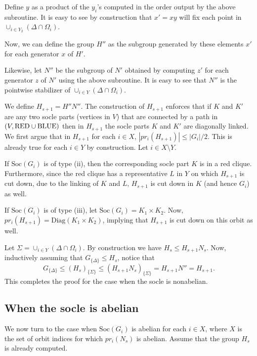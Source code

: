 \documentclass[11pt]{article}
\newcommand{\red}{\mbox{\rm RED}}
\newcommand{\blue}{\mbox{\rm BLUE}}
\newcommand{\Soc}[1]{\ensuremath{\mathrm{Soc}\left(#1\right)}}
\newcommand{\Diag}[1]{\ensuremath{\mathrm{Diag}\left({#1}\right)}}
\newcommand{\pr}[2]{\ensuremath{pr_{#1}\left({#2}\right)}}
\begin{document}
Define $y$ as a product of the $y_i$'s computed in the order output by
the above subroutine. It is easy to see by construction that $x'=xy$
will fix each point in $\cup_{i\in Y_2}(\Delta\cap\Omega_i)$.

Now, we can define the group $H''$ as the subgroup generated by these
elements $x'$ for each generator $x$ of $H'$. 

Likewise, let $N''$ be the subgroup of $N'$ obtained by computing $z'$
for each generator $z$ of $N'$ using the above subroutine. It is easy
to see that $N''$ is the pointwise stabilizer of $\cup_{i\in
Y}(\Delta\cap\Omega_i)$. 

We define $H_{s+1}=H''N''$. The construction of $H_{s+1}$ enforces
that if $K$ and $K'$ are any two socle parts (vertices in $V$) that
are connected by a path in $(V,\red\cup\blue)$ then in $H_{s+1}$ the
socle parts $K$ and $K'$ are diagonally linked. We first argue that in
$H_{s+1}$ for each $i\in X$, $|\pr{i}{H_{s+1}}|\leq |G_i|/2$. This is
already true for each $i\in Y$ by construction. Let $i\in X\setminus
Y$.

If $\Soc{G_i}$ is of type (ii), then the corresponding socle part $K$
is in a red clique. Furthermore, since the red clique has a
representative $L$ in $Y$ on which $H_{s+1}$ is cut down, due to the
linking of $K$ and $L$, $H_{s+1}$ is cut down in $K$ (and hence $G_i$)
as well. 

If $\Soc{G_i}$ is of type (iii), let $\Soc{G_i}=K_1\times K_2$. Now,
$\pr{i}{H_{s+1}}=\Diag{K_1\times K_2}$, implying that $H_{s+1}$ is cut
down on this orbit as well.

Let $\Sigma=\cup_{i\in Y}(\Delta\cap\Omega_i)$. By construction we have
$H_s\leq H_{s+1}N_s$. Now, inductively assuming that
$G_{\{\Delta\}}\leq H_s$, notice that
\[
G_{\{\Delta\}}\leq (H_s)_{\{\Sigma\}}\leq
(H_{s+1}N_s)_{\{\Sigma\}}=H_{s+1}N''=H_{s+1}.
\]
This completes the proof for the case when the socle is nonabelian.

\subsection*{When the socle is abelian}

We now turn to the case when $\Soc{G_i}$ is abelian for each $i\in X$,
where $X$ is the set of orbit indices for which $\pr{i}{N_s}$ is
abelian. Assume that the group $H_s$ is already computed.
\end{document}
